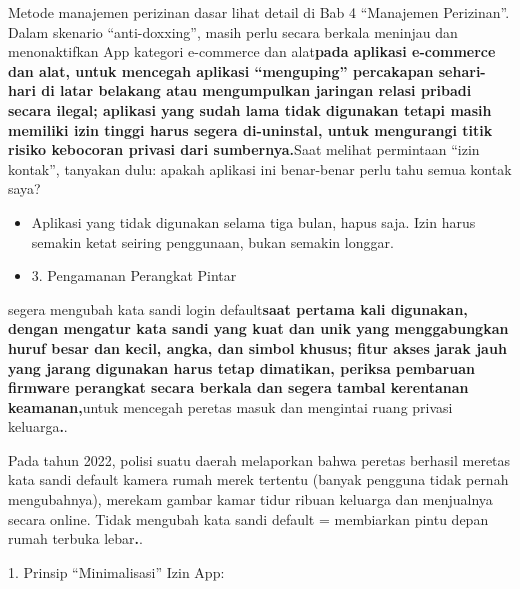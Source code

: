 Metode manajemen perizinan dasar lihat detail di Bab 4 “Manajemen Perizinan”. Dalam skenario “anti-doxxing”, masih perlu secara berkala meninjau dan menonaktifkan App kategori e-commerce dan alat\textbf{pada aplikasi e-commerce dan alat, untuk mencegah aplikasi “menguping” percakapan sehari-hari di latar belakang atau mengumpulkan jaringan relasi pribadi secara ilegal; aplikasi yang sudah lama tidak digunakan tetapi masih memiliki izin tinggi harus segera di-uninstal, untuk mengurangi titik risiko kebocoran privasi dari sumbernya.}Saat melihat permintaan “izin kontak”, tanyakan dulu: apakah aplikasi ini benar-benar perlu tahu semua kontak saya?

\begin{itemize}
  \item Aplikasi yang tidak digunakan selama tiga bulan, hapus saja. Izin harus semakin ketat seiring penggunaan, bukan semakin longgar.
  \item 3. Pengamanan Perangkat Pintar
\end{itemize}


segera mengubah kata sandi login default\textbf{saat pertama kali digunakan, dengan mengatur kata sandi yang kuat dan unik yang menggabungkan huruf besar dan kecil, angka, dan simbol khusus; fitur akses jarak jauh yang jarang digunakan harus tetap dimatikan, periksa pembaruan firmware perangkat secara berkala dan segera tambal kerentanan keamanan,}untuk mencegah peretas masuk dan mengintai ruang privasi keluarga\textbf{.}.

\begin{tcbwarn}{Pada tahun 2022, polisi suatu daerah melaporkan bahwa peretas berhasil meretas kata sandi default kamera rumah merek tertentu (banyak pengguna tidak pernah mengubahnya), merekam gambar kamar tidur ribuan keluarga dan menjualnya secara online.}
Tidak mengubah kata sandi default = membiarkan pintu depan rumah terbuka lebar\textbf{.}.

\end{tcbwarn}


1. Prinsip “Minimalisasi” Izin App:


